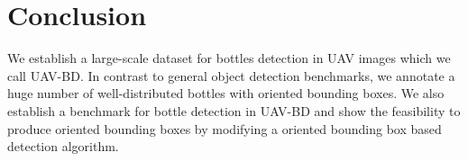 \section{Conclusion}
\label{sec:conclusion}


We establish a large-scale dataset for bottles detection in UAV images which we call UAV-BD. In contrast to general object detection benchmarks, we annotate a huge number of well-distributed bottles with oriented bounding boxes. We also establish a benchmark for bottle detection in UAV-BD and show the feasibility to produce oriented bounding boxes by modifying a oriented bounding box based detection algorithm.